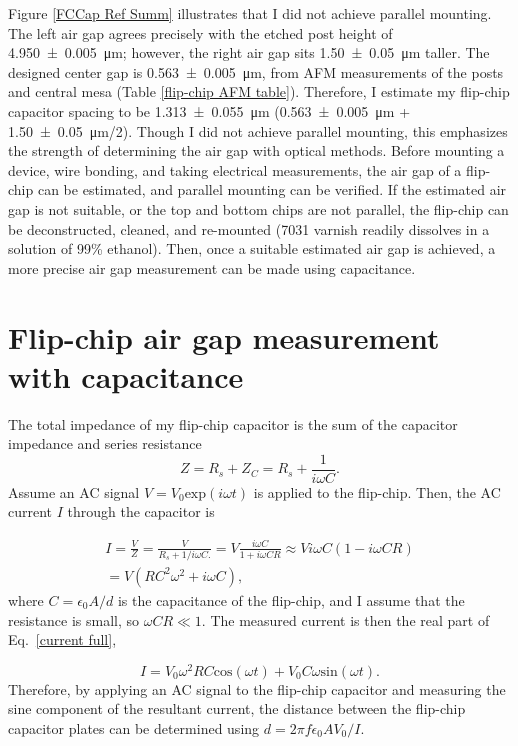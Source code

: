 \documentclass[double,12pt,1in,seploa]{beavtex}
\let\Oldsection\section
\renewcommand{\section}{\FloatBarrier\Oldsection}
\begin{document}
Figure \ref{FCCap Ref Summ} illustrates that I did not achieve parallel mounting. The left air gap agrees precisely with the etched post height of \SI{4.950(5)}{\micro\meter}; however, the right air gap sits \SI{1.50(5)}{\micro\meter} taller. The designed center gap is \SI{0.563(5)}{\micro\meter}, from AFM measurements of the posts and central mesa (Table \ref{flip-chip AFM table}). Therefore, I estimate my flip-chip capacitor spacing to be \SI{1.313(55)}{\micro\meter} (\SI{0.563(5)}{\micro\meter} + \SI{1.50(5)}{\micro\meter}/2). Though I did not achieve parallel mounting, this emphasizes the strength of determining the air gap with optical methods. Before mounting a device, wire bonding, and taking electrical measurements, the air gap of a flip-chip can be estimated, and parallel mounting can be verified. If the estimated air gap is not suitable, or the top and bottom chips are not parallel, the flip-chip can be deconstructed, cleaned, and re-mounted (7031 varnish readily dissolves in a solution of 99\% ethanol). Then, once a suitable estimated air gap is achieved, a more precise air gap measurement can be made using capacitance.


\section{Flip-chip air gap measurement with capacitance}
The total impedance of my flip-chip capacitor is the sum of the capacitor impedance and series resistance
\begin{equation}
    Z = R_s + Z_C = R_s + \frac{1}{i\omega C}.
\end{equation}
Assume an AC signal $V = V_0 \mathrm{exp}(i\omega t)$ is applied to the flip-chip. Then, the AC current $I$ through the capacitor is 

\begin{equation} \label{current full}
    \begin{split}
        I = \frac{V}{Z} = \frac{V}{R_s + 1/i\omega C.} = V \frac{i\omega C}{1 + i\omega C R}\approx V i\omega C (1 - i\omega C R) 
        \\ = V(R C^2 \omega ^2 + i\omega C),
    \end{split}
\end{equation}
where $C = \epsilon_0 A / d$ is the capacitance of the flip-chip, and I assume that the resistance is small, so $\omega C R \ll 1$. The measured current is then the real part of Eq.\ \ref{current full}, 

\begin{equation}
    I = V_0\omega^2 R C \mathrm{cos}(\omega t) + V_0 C \omega \mathrm{sin}(\omega t).
\end{equation}
Therefore, by applying an AC signal to the flip-chip capacitor and measuring the sine component of the resultant current, the distance between the flip-chip capacitor plates can be determined using $d = 2\pi f \epsilon_0 A V_0 / I$. 
\end{document}
